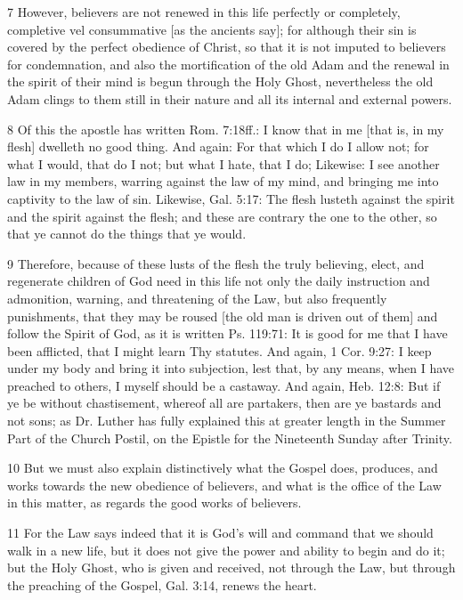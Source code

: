 7 However, believers are not renewed in this life perfectly or completely, completive vel consummative [as the ancients say]; for although their sin is covered by the perfect obedience of Christ, so that it is not imputed to believers for condemnation, and also the mortification of the old Adam and the renewal in the spirit of their mind is begun through the Holy Ghost, nevertheless the old Adam clings to them still in their nature and all its internal and external powers.

8 Of this the apostle has written Rom. 7:18ff.: I know that in me [that is, in my flesh] dwelleth no good thing. And again: For that which I do I allow not; for what I would, that do I not; but what I hate, that I do; Likewise: I see another law in my members, warring against the law of my mind, and bringing me into captivity to the law of sin. Likewise, Gal. 5:17: The flesh lusteth against the spirit and the spirit against the flesh; and these are contrary the one to the other, so that ye cannot do the things that ye would.

9 Therefore, because of these lusts of the flesh the truly believing, elect, and regenerate children of God need in this life not only the daily instruction and admonition, warning, and threatening of the Law, but also frequently punishments, that they may be roused [the old man is driven out of them] and follow the Spirit of God, as it is written Ps. 119:71: It is good for me that I have been afflicted, that I might learn Thy statutes. And again, 1 Cor. 9:27: I keep under my body and bring it into subjection, lest that, by any means, when I have preached to others, I myself should be a castaway. And again, Heb. 12:8: But if ye be without chastisement, whereof all are partakers, then are ye bastards and not sons; as Dr. Luther has fully explained this at greater length in the Summer Part of the Church Postil, on the Epistle for the Nineteenth Sunday after Trinity.

10 But we must also explain distinctively what the Gospel does, produces, and works towards the new obedience of believers, and what is the office of the Law in this matter, as regards the good works of believers.

11 For the Law says indeed that it is God’s will and command that we should walk in a new life, but it does not give the power and ability to begin and do it; but the Holy Ghost, who is given and received, not through the Law, but through the preaching of the Gospel, Gal. 3:14, renews the heart.

